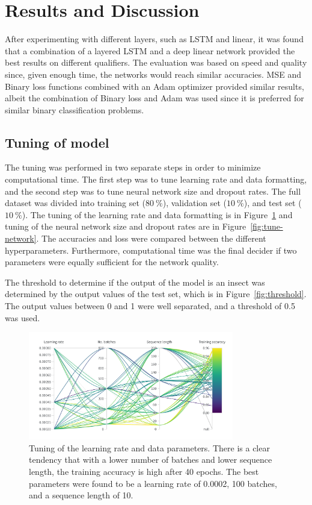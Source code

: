 \section{Results and Discussion}\label{sec:results-and-discussion}
After experimenting with different layers, such as LSTM and linear, it was found that a combination of a layered LSTM and a deep linear network provided the best results on different qualifiers.
The evaluation was based on speed and quality since, given enough time, the networks would reach similar accuracies.
MSE and Binary loss functions combined with an Adam optimizer provided similar results, albeit the combination of Binary loss and Adam was used since it is preferred for similar binary classification problems\cite{https://doi.org/10.1002/for.2585}.


\subsection{Tuning of model}\label{subsec:tuning-of-model}

The tuning was performed in two separate steps in order to minimize computational time.
The first step was to tune learning rate and data formatting, and the second step was to tune neural network size and dropout rates.
The full dataset was divided into training set ($80 \:  \%$), validation set ($10 \:  \%$), and test set ($10 \:  \%$).
The tuning of the learning rate and data formatting is in Figure~\ref{fig:tune-data} and tuning of the neural network size and dropout rates are in Figure~\ref{fig:tune-network}.
The accuracies and loss were compared between the different hyperparameters.
Furthermore, computational time was the final decider if two parameters were equally sufficient for the network quality.

The threshold to determine if the output of the model is an insect was determined by the output values of the test set, which is in Figure~\ref{fig:threshold}.
The output values between 0 and 1 were well separated, and a threshold of 0.5 was used.


\begin{figure}[htb]
  \centering
  \includegraphics[width=0.8\textwidth]{Figures/data_tuning}
  \caption{Tuning of the learning rate and data parameters. There is a clear tendency that with a lower number of batches and lower sequence length, the training accuracy is high after 40 epochs. The best parameters were found to be a learning rate of 0.0002, 100 batches, and a sequence length of 10.}
  \label{fig:tune-data}
\end{figure}

